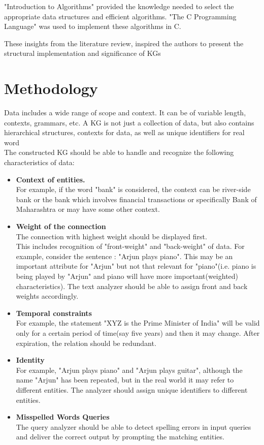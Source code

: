 \documentclass[conference]{IEEEtran}
\begin{document}
"Introduction to Algorithms" \cite{b14} provided the knowledge needed to select the appropriate data structures and efficient algorithms. "The C Programming Language" \cite{b9} was used to implement these algorithms in C.

These insights from the literature review, inspired the authors to present the structural implementation and significance of KGs

\section{Methodology}
Data includes a wide range of scope and context. It can be of variable length, contexts, grammars, etc.
A KG is not just a collection of data, but also contains hierarchical structures, contexts for data, as well as unique identifiers for real word \cite{b8}
\\
The constructed KG should be able to handle and recognize the following characteristics of data:
\begin{itemize}
    \item\textbf{Context of entities.}\cite{b8}\\ 
    For example, if the word "bank" is considered, the context can be river-side bank or the bank which involves financial transactions or specifically Bank of Maharashtra or may have some other context.
    

    
	\item\textbf{Weight of the connection}
 \\
 The connection with highest weight should be displayed first.
 \\
 This includes recognition of "front-weight" and "back-weight" of data. For example, consider the sentence : "Arjun plays piano". This may be an important attribute for "Arjun" but not that relevant for "piano"(i.e. piano is being played by "Arjun" and piano will have more important(weighted) characteristics). The text analyzer should be able to assign front and back weights accordingly.

 
	\item\textbf{Temporal constraints} \cite{b8, b17}
 \\
 For example, the statement "XYZ is the Prime Minister of India" will be valid only for a certain period of time(say five years) and then it may change. After expiration, the relation should be redundant.

 
	\item\textbf{Identity} \cite{b8,b16}
 \\
 For example, "Arjun plays piano" and "Arjun plays guitar", although the name "Arjun" has been repeated, but in the real world it may refer to different entities. 
 The analyzer should assign unique identifiers to different entities.
	
 \item\textbf{Misspelled Words Queries} 
 \\
 The query analyzer should be able to detect spelling errors in input queries and deliver the correct output by prompting the matching entities.
 
\end{itemize}
\end{document}
